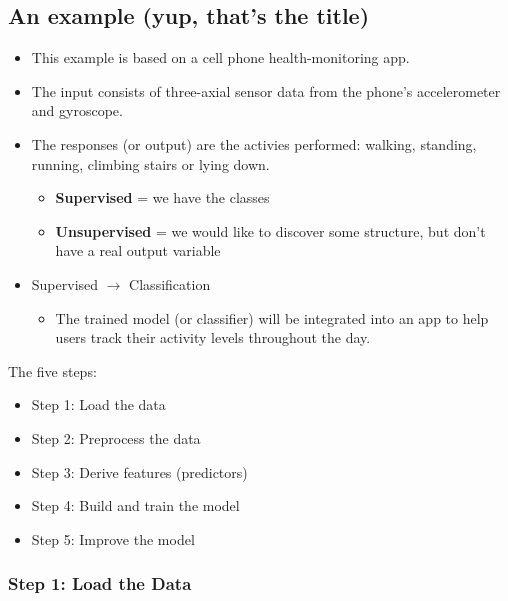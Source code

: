 \documentclass[a4paper]{article}
\begin{document}
		\subsection{An example (yup, that's the title)}
		
		\begin{itemize}
			\item This example is based on a cell phone health-monitoring app.
			\item The input consists of three-axial sensor data from the phone's accelerometer and gyroscope.
			\item The responses (or output) are the activies performed: walking, standing, running, climbing stairs or lying down.
				\begin{itemize}
					\item \textbf{Supervised} = we have the classes
					\item  \textbf{Unsupervised} = we would like to discover some structure, but don't have a real output variable
				\end{itemize}
			\item Supervised $\rightarrow$ Classification
				\begin{itemize}
					\item The trained model (or classifier) will be integrated into an app to help users track their activity levels throughout the day.
				\end{itemize}
		\end{itemize}
	
		\newpage
		
		The five steps:
		\begin{itemize}
			\item Step 1: Load the data
			\item Step 2: Preprocess the data
			\item Step 3: Derive features (predictors)
			\item Step 4: Build and train the model
			\item Step 5: Improve the model
		\end{itemize}
	
			\subsubsection{Step 1: Load the Data}
			
\end{document}
